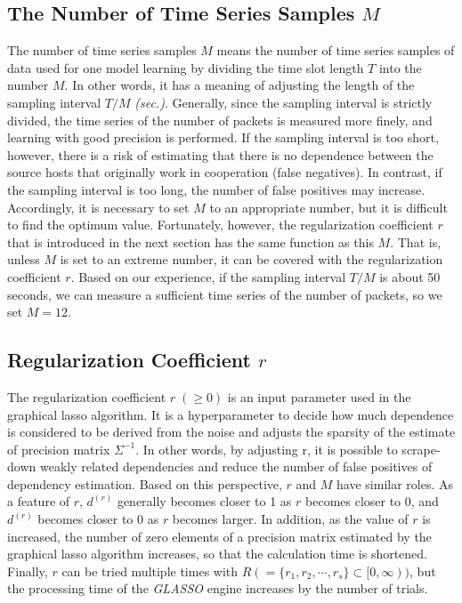 \documentclass[conference]{IEEEtran}
\begin{document}
\subsection{The Number of Time Series Samples $M$}
The number of time series samples $M$ means the number of time series samples of data used for one model learning by dividing the time slot length $T$ into the number $M$.
In other words, it has a meaning of adjusting the length of the sampling interval $T/M$ \textit{(sec.)}.
Generally, since the sampling interval is strictly divided, the time series of the number of packets is measured more finely, and learning with good precision is performed.
If the sampling interval is too short, however, there is a risk of estimating that there is no dependence between the source hosts that originally work in cooperation (false negatives).
In contrast, if the sampling interval is too long, the number of false positives may increase.
Accordingly, it is necessary to set $M$ to an appropriate number, but it is difficult to find the optimum value.
Fortunately, however, the regularization coefficient $r$ that is introduced in the next section has the same function as this $M$.
That is, unless $M$ is set to an extreme number, it can be covered with the regularization coefficient $r$.
Based on our experience, if the sampling interval $T/M$ is about 50 seconds, we can measure a sufficient time series of the number of packets, so we set $M=12$.





\subsection{Regularization Coefficient $r$}
The regularization coefficient $r\;(\geq 0)$ is an input parameter used in the graphical lasso algorithm.
It is a hyperparameter to decide how much dependence is considered to be derived from the noise and adjusts the sparsity of the estimate of precision matrix $\Sigma^{-1}$.
In other words, by adjusting r, it is possible to scrape-down weakly related dependencies and reduce the number of false positives of dependency estimation.
Based on this perspective, $r$ and $M$ have similar roles.
As a feature of $r$, $d^{(r)}$ generally becomes closer to 1 as $r$ becomes closer to 0, and $d^{(r)}$ becomes closer to 0 as $r$ becomes larger.
In addition, as the value of $r$ is increased, the number of zero elements of a precision matrix estimated by the graphical lasso algorithm increases, so that the calculation time is shortened.
Finally, $r$ can be tried multiple times with $R ( = \{r_1, r_2, \cdots, r_s\}\subset [0,\infty))$, but the processing time of the \textit{GLASSO} engine increases by the number of trials.
\end{document}
